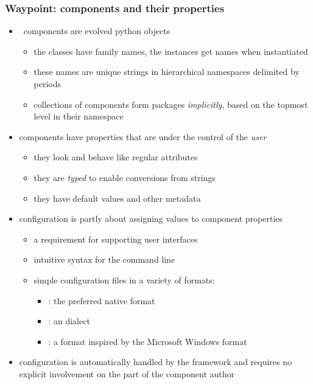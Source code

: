 \begin{frame}
%
  \frametitle{Waypoint: components and their properties}
%
  \begin{itemize}
%
  \item \pyre\ components are evolved python objects
    \begin{itemize}
    \item the classes have family names, the instances get names when instantiated
    \item these names are unique strings in hierarchical namespaces delimited by periods
    \item collections of components form packages \emph{implicitly}, based on the topmost level
      in their namespace
    \end{itemize}
%
  \item components have properties that are under the control of the \emph{user}
    \begin{itemize}
    \item they look and behave like regular attributes
    \item they are \emph{typed} to enable conversions from strings
    \item they have default values and other metadata
    \end{itemize}
%
  \item configuration is partly about assigning values to component properties
    \begin{itemize}
    \item a requirement for supporting user interfaces
    \item intuitive syntax for the command line
    \item simple configuration files in a variety of formats:
      \begin{itemize}
      \item {}: the preferred native format
      \item {}: an  dialect
      \item {}: a format inspired by the Microsoft Windows  format
      \end{itemize}
    \end{itemize}
%
  \item configuration is automatically handled by the framework and requires no explicit
    involvement on the part of the component author
%
  \end{itemize}
%
\end{frame}

